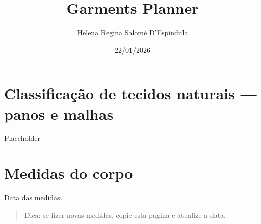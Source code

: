 \documentclass[
  brazilian,
  8pt,
  oneside]{book}
\title{Garments Planner}
\author{Helena Regina Salomé D'Espindula}
\date{22/01/2026}
\begin{document}
\maketitle

{
\setcounter{tocdepth}{1}
\tableofcontents
}
\chapter{Classificação de tecidos naturais --- panos e malhas}\label{classificauxe7uxe3o-de-tecidos-naturais-panos-e-malhas}

Placeholder

\chapter{Medidas do corpo}\label{medidas-do-corpo}

Data das medidas: \fieldline

\begin{quote}
Dica: se fizer novas medidas, copie esta pagina e atualize a data.
\end{quote}
\end{document}
